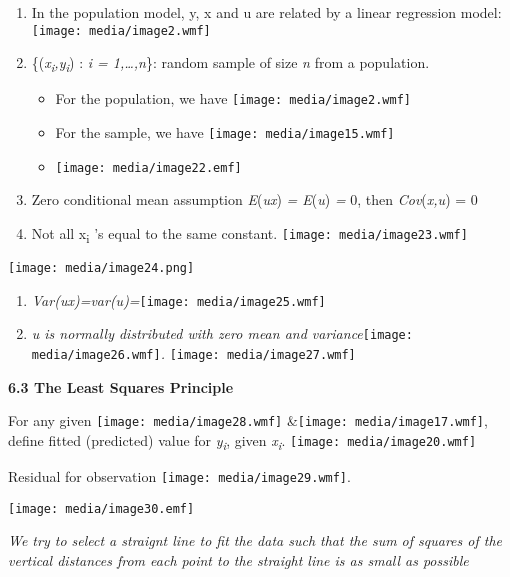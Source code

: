 \begin{enumerate}
\def\labelenumi{\arabic{enumi}.}
\item
  In the population model, y, x and u are related by a linear regression
  model: \texttt{[image: media/image2.wmf]}
\item
  \{(\emph{x\textsubscript{i},y\textsubscript{i}}) : \emph{i =
  1,\ldots,n}\}: random sample of size \emph{n} from a population.

  \begin{itemize}
  \item
    For the population, we have \texttt{[image: media/image2.wmf]}
  \item
    For the sample, we have \texttt{[image: media/image15.wmf]}
  \item
    \texttt{[image: media/image22.emf]}
  \end{itemize}
\item
  Zero conditional mean assumption \emph{E}(\emph{u\textbar x}) \emph{=
  E}(\emph{u}) \emph{=} 0, then \emph{Cov}(\emph{x,u}) = 0
\item
  Not all x\textsubscript{i} 's equal to the same constant.
  \texttt{[image: media/image23.wmf]}
\end{enumerate}

\texttt{[image: media/image24.png]}

\begin{enumerate}
\def\labelenumi{\arabic{enumi}.}
\setcounter{enumi}{4}
\item
  \emph{Var(u\textbar x)=var(u)=}\texttt{[image: media/image25.wmf]}
\item
  \emph{u is normally distributed with zero mean and
  variance}\texttt{[image: media/image26.wmf]}\emph{.}
  \texttt{[image: media/image27.wmf]}
\end{enumerate}

\textbf{6.3 The Least Squares Principle}

For any given \texttt{[image: media/image28.wmf]}
\&\texttt{[image: media/image17.wmf]}, define fitted (predicted) value
for \emph{y\textsubscript{i}}, given \emph{x\textsubscript{i}}.
\texttt{[image: media/image20.wmf]}

Residual for observation \texttt{[image: media/image29.wmf]}.

\texttt{[image: media/image30.emf]}

\emph{We try to select a straignt line to fit the data such that the sum
of squares of the vertical distances from each point to the straight
line is as small as possible}

